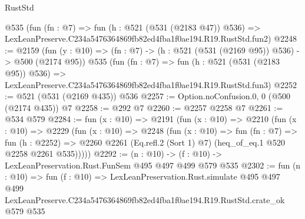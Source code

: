 \begin{lexlean}{RustStd}
\begin{coremodule}
    @535
    (fun (fn : @7) =>
    fun (h : @521 (@531 (@2183 @47)) @536) =>
    LexLeanPreserve.C234a5476364869fb82ed4fba1f0ae194.R19.RustStd.fun2)
@2248 := @2159
    (fun (y : @10) => (fn : @7) -> (h : @521 (@531 (@2169 @95)) @536) -> @500 (@2174 @95))
    @535
    (fun (fn : @7) =>
    fun (h : @521 (@531 (@2183 @95)) @536) =>
    LexLeanPreserve.C234a5476364869fb82ed4fba1f0ae194.R19.RustStd.fun3)
@2252 := @521 (@531 (@2169 @435)) @536
@2257 := Option.noConfusion.{0, 0} (@500 (@2174 @435)) @7
@2258 := @292 @7
@2260 := @2257 @2258 @7
@2261 := @534 @579
@2284 := fun (x : @10) =>
  @2191
    (fun (x : @10) =>
    @2210
      (fun (x : @10) =>
      @2229
        (fun (x : @10) =>
        @2248
          (fun (x : @10) =>
          fun (fn : @7) =>
          fun (h : @2252) =>
          @2260 @2261 (Eq.refl.{2} (Sort 1) @7) (heq_of_eq.{1} @520 @2258 @2261 @535)))))
@2292 := (n : @10) -> (f : @10) -> LexLeanPreservation.Rust.FunSem @495 @497 @499 @579 @535
@2302 := fun (n : @10) =>
  fun (f : @10) =>
  LexLeanPreservation.Rust.simulate
    @495
    @497
    @499
    LexLeanPreserve.C234a5476364869fb82ed4fba1f0ae194.R19.RustStd.crate_ok
    @579
    @535
\end{coremodule}
\end{lexlean}
